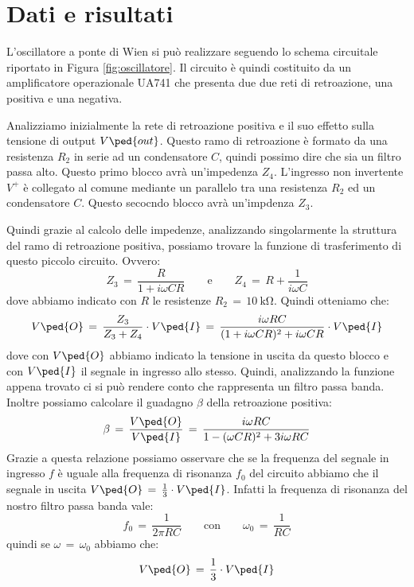 \section*{Dati e risultati}

L'oscillatore a ponte di Wien si può realizzare seguendo lo schema circuitale riportato in Figura \ref{fig:oscillatore}.
Il circuito è quindi costituito da un amplificatore operazionale UA741 che presenta due due reti di retroazione, una positiva e una negativa.

Analizziamo inizialmente la rete di retroazione positiva e il suo effetto sulla tensione di output $V\ped{out}$.
Questo ramo di retroazione è formato da una resistenza $R_2$ in serie ad un condensatore $C$, quindi possimo dire che sia un filtro passa alto. Questo primo blocco avrà un'impedenza $Z_4$. L'ingresso non invertente $V^+$ è collegato al comune mediante un parallelo tra una resistenza $R_2$ ed un condensatore $C$. Questo secocndo blocco avrà un'impdenza $Z_3$.

Quindi grazie al calcolo delle impedenze, analizzando singolarmente la struttura del ramo di retroazione positiva, possiamo trovare la funzione di trasferimento di questo piccolo circuito. Ovvero:
\begin{equation}
	Z_3\,=\,\frac{R}{1 + i \omega C R} \qquad \text{e} \qquad Z_4\,=\,R + \frac{1}{i \omega C}
\end{equation}
dove abbiamo indicato con $R$ le resistenze $R_2\,=\,\SI{10}{\kilo\ohm}$. Quindi otteniamo che:
\begin{equation}
	V\ped{O}\,=\,\frac{Z_3}{Z_3 + Z_4} \cdot V\ped{I}\,=\,\frac{i \omega R C}{(1 + i \omega C R)^2 + i \omega C R} \cdot V\ped{I}
\end{equation}
dove con $V\ped{O}$ abbiamo indicato la tensione in uscita da questo blocco e con $V\ped{I}$ il segnale in ingresso allo stesso.
Quindi, analizzando la funzione appena trovato ci si può rendere conto che rappresenta un filtro passa banda. Inoltre possiamo calcolare il guadagno $\beta$ della retroazione positiva:
\begin{equation}
	\beta\,=\,\frac{V\ped{O}}{V\ped{I}}\,=\,\frac{i \omega R C}{1 - (\omega C R)^2 + 3 i \omega R C}
\end{equation}
Grazie a questa relazione possiamo osservare che se la frequenza del segnale in ingresso $f$ è uguale alla frequenza di risonanza $f_0$ del circuito abbiamo che il segnale in uscita $V\ped{O}\,=\,\frac{1}{3} \cdot V\ped{I}$. Infatti la frequenza di risonanza del nostro filtro passa banda vale:
\begin{equation}
	f_0\,=\, \frac{1}{2 \pi R C} \qquad \text{con} \qquad \omega_0\,=\,\frac{1}{RC}
\end{equation}
quindi se $\omega \,=\, \omega_0$ abbiamo che:
\begin{equation}
	V\ped{O}\,=\,\frac{1}{3} \cdot V\ped{I}
\end{equation}

